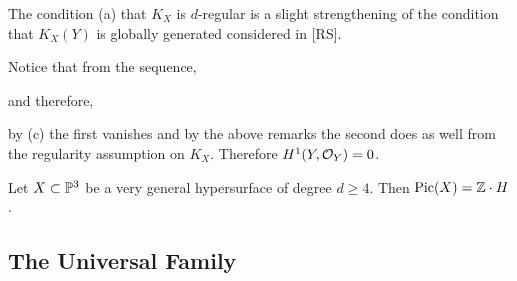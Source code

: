 \documentclass[12pt]{article}
\begin{document}
\begin{rmk}
The condition (a) that $K_X$ is $d$-regular is a slight strengthening of the condition that $K_X(Y)$ is globally generated considered in [RS].
\end{rmk}

\begin{rmk}
Notice that from the sequence,
\begin{center}
\end{center}
and therefore,
\begin{center}
\end{center}
by (c) the first vanishes and by the above remarks the second does as well from the regularity assumption on $K_X$. Therefore $H^1(Y, \struct{Y}) = 0$.
\end{rmk}

\begin{cor}
Let $X \subset \P^3$ be a very general hypersurface of degree $d \ge 4$. Then $\Pic{X} = \Z \cdot H$.
\end{cor}

\subsection{The Universal Family}
\end{document}
